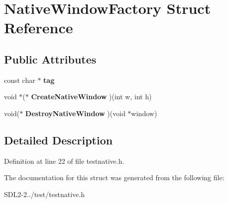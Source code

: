 \hypertarget{structNativeWindowFactory}{\section{Native\+Window\+Factory Struct Reference}
\label{structNativeWindowFactory}
}
\subsection*{Public Attributes}
\begin{DoxyCompactItemize}
\item 
\hypertarget{structNativeWindowFactory_a060b40251dfcd62a39812b8e971f11fe}{const char $\ast$ {\bfseries tag}}\label{structNativeWindowFactory_a060b40251dfcd62a39812b8e971f11fe}

\item 
\hypertarget{structNativeWindowFactory_ab53b8a66d49db2f46440a4d4d5482685}{void $\ast$($\ast$ {\bfseries Create\+Native\+Window} )(int w, int h)}\label{structNativeWindowFactory_ab53b8a66d49db2f46440a4d4d5482685}

\item 
\hypertarget{structNativeWindowFactory_a31ccd4ce1039bd7b6eae7302b2d558eb}{void($\ast$ {\bfseries Destroy\+Native\+Window} )(void $\ast$window)}\label{structNativeWindowFactory_a31ccd4ce1039bd7b6eae7302b2d558eb}

\end{DoxyCompactItemize}


\subsection{Detailed Description}


Definition at line 22 of file testnative.\+h.



The documentation for this struct was generated from the following file\+:\begin{DoxyCompactItemize}
\item 
S\+D\+L2-\/2../test/testnative.\+h\end{DoxyCompactItemize}
